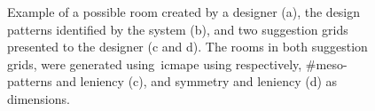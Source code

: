 \begin{figure}[!h]
    \centering
     \hfill
     
     \hfill
    
    \caption{Example of a possible room created by a designer (a), the design patterns identified by the system (b), and two suggestion grids presented to the designer (c and d). The rooms in both suggestion grids, were generated using~\acrshort{icmape} using respectively, \#meso-patterns and leniency (c), and symmetry and leniency (d) as dimensions.}
    \label{fig:corridorExample}
\end{figure}


